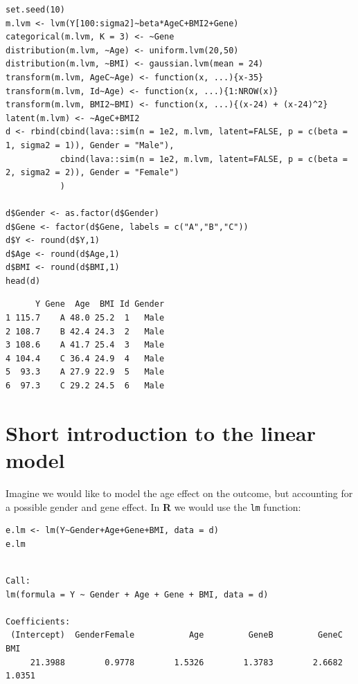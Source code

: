 \documentclass[12pt]{article}
\newcommand\Rlogo{\textbf{\textsf{R}}\xspace} %
\begin{document}
\lstset{language=r,label= ,caption= ,captionpos=b,numbers=none}
\begin{lstlisting}
set.seed(10)
m.lvm <- lvm(Y[100:sigma2]~beta*AgeC+BMI2+Gene)
categorical(m.lvm, K = 3) <- ~Gene
distribution(m.lvm, ~Age) <- uniform.lvm(20,50)
distribution(m.lvm, ~BMI) <- gaussian.lvm(mean = 24)
transform(m.lvm, AgeC~Age) <- function(x, ...){x-35}
transform(m.lvm, Id~Age) <- function(x, ...){1:NROW(x)}
transform(m.lvm, BMI2~BMI) <- function(x, ...){(x-24) + (x-24)^2}
latent(m.lvm) <- ~AgeC+BMI2
d <- rbind(cbind(lava::sim(n = 1e2, m.lvm, latent=FALSE, p = c(beta = 1, sigma2 = 1)), Gender = "Male"),
		   cbind(lava::sim(n = 1e2, m.lvm, latent=FALSE, p = c(beta = 2, sigma2 = 2)), Gender = "Female")
		   )

d$Gender <- as.factor(d$Gender)
d$Gene <- factor(d$Gene, labels = c("A","B","C"))
d$Y <- round(d$Y,1)
d$Age <- round(d$Age,1)
d$BMI <- round(d$BMI,1)
head(d)
\end{lstlisting}

\begin{verbatim}
      Y Gene  Age  BMI Id Gender
1 115.7    A 48.0 25.2  1   Male
2 108.7    B 42.4 24.3  2   Male
3 108.6    A 41.7 25.4  3   Male
4 104.4    C 36.4 24.9  4   Male
5  93.3    A 27.9 22.9  5   Male
6  97.3    C 29.2 24.5  6   Male
\end{verbatim}

\clearpage

\section{Short introduction to the linear model}
\label{sec:orgb7d40ff}

Imagine we would like to model the age effect on the outcome, but
accounting for a possible gender and gene effect. In \Rlogo{} we would
use the \texttt{lm} function:
\lstset{language=r,label= ,caption= ,captionpos=b,numbers=none}
\begin{lstlisting}
e.lm <- lm(Y~Gender+Age+Gene+BMI, data = d)
e.lm
\end{lstlisting}

\begin{verbatim}

Call:
lm(formula = Y ~ Gender + Age + Gene + BMI, data = d)

Coefficients:
 (Intercept)  GenderFemale           Age         GeneB         GeneC           BMI  
     21.3988        0.9778        1.5326        1.3783        2.6682        1.0351
\end{verbatim}
\end{document}
